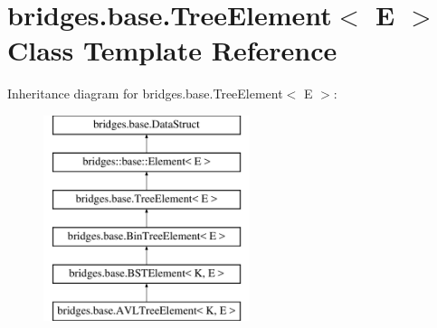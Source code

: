 \hypertarget{classbridges_1_1base_1_1_tree_element}{}\section{bridges.\+base.\+Tree\+Element$<$ E $>$ Class Template Reference}
\label{classbridges_1_1base_1_1_tree_element}
Inheritance diagram for bridges.\+base.\+Tree\+Element$<$ E $>$\+:\begin{figure}[H]
\begin{center}
\leavevmode
\includegraphics[height=6.000000cm]{classbridges_1_1base_1_1_tree_element}
\end{center}
\end{figure}
